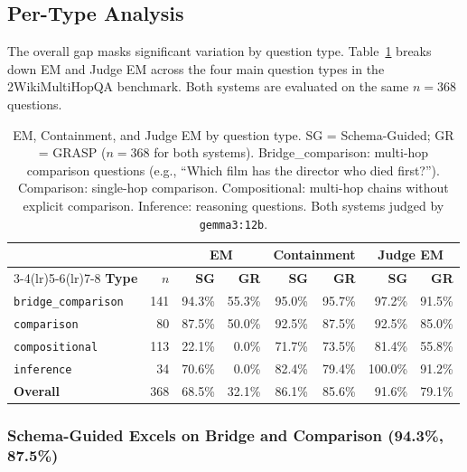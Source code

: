 \subsection{Per-Type Analysis}
\label{sec:per-type-analysis}

The overall gap masks significant variation by question type. Table~\ref{tab:per-type-em} breaks down EM and Judge EM across the four main question types in the 2WikiMultiHopQA benchmark. Both systems are evaluated on the same $n=368$ questions.

\begin{table}[h]
\centering
\begin{tabular}{lrrrrrrr}
\toprule
 & & \multicolumn{2}{c}{\textbf{EM}} & \multicolumn{2}{c}{\textbf{Containment}} & \multicolumn{2}{c}{\textbf{Judge EM}} \\
\cmidrule(lr){3-4}\cmidrule(lr){5-6}\cmidrule(lr){7-8}
\textbf{Type} & \textbf{$n$} & \textbf{SG} & \textbf{GR} & \textbf{SG} & \textbf{GR} & \textbf{SG} & \textbf{GR} \\
\midrule
\texttt{bridge\_comparison} & 141 & 94.3\% & 55.3\% & 95.0\% & 95.7\% & 97.2\% & 91.5\% \\
\texttt{comparison}         & 80  & 87.5\% & 50.0\% & 92.5\% & 87.5\% & 92.5\% & 85.0\% \\
\texttt{compositional}      & 113 & 22.1\% & 0.0\%  & 71.7\% & 73.5\% & 81.4\% & 55.8\% \\
\texttt{inference}          & 34  & 70.6\% & 0.0\%  & 82.4\% & 79.4\% & 100.0\% & 91.2\% \\
\midrule
\textbf{Overall}            & 368 & 68.5\% & 32.1\% & 86.1\% & 85.6\% & 91.6\% & 79.1\% \\
\bottomrule
\end{tabular}
\caption{EM, Containment, and Judge EM by question type. SG = Schema-Guided; GR = GRASP ($n=368$ for both systems). Bridge\_comparison: multi-hop comparison questions (e.g., ``Which film has the director who died first?''). Comparison: single-hop comparison. Compositional: multi-hop chains without explicit comparison. Inference: reasoning questions. Both systems judged by \texttt{gemma3:12b}.}
\label{tab:per-type-em}
\end{table}

\subsubsection{Schema-Guided Excels on Bridge and Comparison (94.3\%, 87.5\%)}


